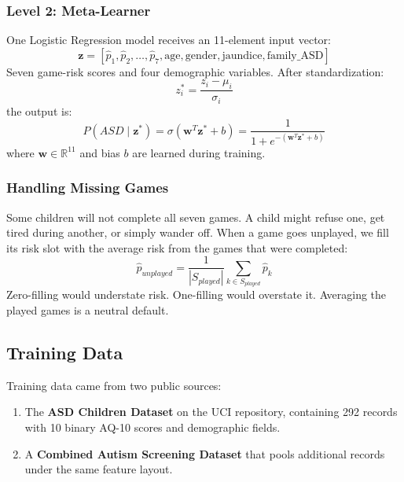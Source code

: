 \documentclass[conference]{IEEEtran}
\begin{document}
\subsubsection{Level 2: Meta-Learner}
One Logistic Regression model receives an 11-element input vector:
\begin{equation}
\mathbf{z} = [\hat{p}_1, \hat{p}_2, \ldots, \hat{p}_7, \text{age}, \text{gender}, \text{jaundice}, \text{family\_ASD}]
\label{eq:meta_features}
\end{equation}
Seven game-risk scores and four demographic variables. After standardization:
\begin{equation}
z_i^{*} = \frac{z_i - \mu_i}{\sigma_i}
\label{eq:scaling}
\end{equation}
the output is:
\begin{equation}
P(ASD \mid \mathbf{z}^{*}) = \sigma(\mathbf{w}^T \mathbf{z}^{*} + b) = \frac{1}{1 + e^{-(\mathbf{w}^T \mathbf{z}^{*} + b)}}
\label{eq:sigmoid}
\end{equation}
where $\mathbf{w} \in \mathbb{R}^{11}$ and bias $b$ are learned during training.

\subsubsection{Handling Missing Games}
Some children will not complete all seven games. A child might refuse one, get tired during another, or simply wander off. When a game goes unplayed, we fill its risk slot with the average risk from the games that were completed:
\begin{equation}
\hat{p}_{unplayed} = \frac{1}{|S_{played}|} \sum_{k \in S_{played}} \hat{p}_k
\label{eq:imputation}
\end{equation}
Zero-filling would understate risk. One-filling would overstate it. Averaging the played games is a neutral default.

\subsection{Training Data}
Training data came from two public sources:

\begin{enumerate}
    \item The \textbf{ASD Children Dataset} on the UCI repository, containing 292 records with 10 binary AQ-10 scores and demographic fields.
    \item A \textbf{Combined Autism Screening Dataset} that pools additional records under the same feature layout.
\end{enumerate}
\end{document}
